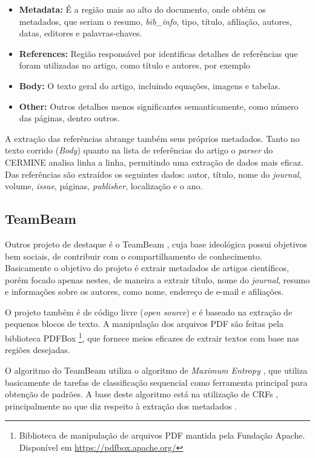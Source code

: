 \begin{itemize}
\item \textbf{Metadata:} É a região mais ao alto do documento, onde obtém os metadados, que seriam o resumo, \textit{bib\_info}, tipo, título, afiliação, autores, datas, editores e palavras-chaves.
\item \textbf{References:} Região responsável por identificas detalhes de referências que foram utilizadas no artigo, como título e autores, por exemplo
\item \textbf{Body:} O texto geral do artigo, incluindo equações, imagens e tabelas.
\item \textbf{Other:} Outros detalhes menos significantes semanticamente, como número das páginas, dentro outros.
\end{itemize}

A extração das referências abrange também seus próprios metadados. Tanto no texto corrido (\textit{Body}) quanto na lista de referências do artigo o \textit{parser} do CERMINE analisa linha a linha, permitindo uma extração de dados mais eficaz. Das referências são extraídos os seguintes dados: autor, título, nome do \textit{journal}, volume, \textit{issue}, páginas, \textit{publisher}, localização e o ano.

\subsection{TeamBeam}

Outros projeto de destaque é o TeamBeam \cite{teambeam}, cuja base ideológica possui objetivos bem sociais, de contribuir com o compartilhamento de conhecimento. Basicamente o objetivo do projeto é extrair metadados de artigos científicos, porém focado apenas nestes, de maneira a extrair título, nome do \textit{journal}, resumo e informações sobre os autores, como nome, endereço de e-mail e afiliações.

O projeto também é de código livre (\textit{open source}) e é baseado na extração de pequenos blocos de texto. A manipulação dos arquivos PDF são feitas pela biblioteca PDFBox \footnote{Biblioteca de manipulação de arquivos PDF mantida pela Fundação Apache. Disponível em \url{https://pdfbox.apache.org/}}, que fornece meios eficazes de extrair textos com base nas regiões desejadas.

O algoritmo do TeamBeam utiliza o algoritmo de \textit{Maximum Entropy} \cite{maximum-entropy}, que utiliza basicamente de tarefas de classificação sequencial como ferramenta principal para obtenção de padrões. A base deste algoritmo está na utilização de CRFs \cite{crf}, principalmente no que diz respeito à extração dos metadados \cite{crf-ie}.

